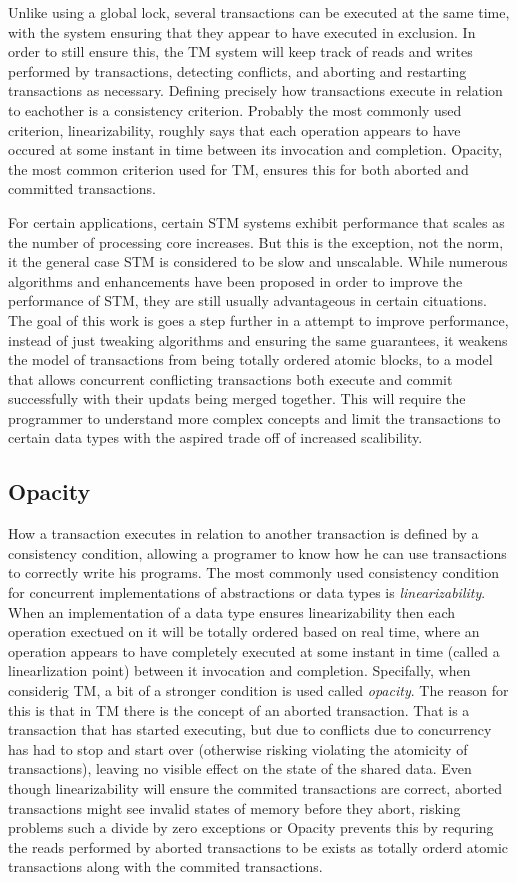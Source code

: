 \documentclass[11pt,letterpaper]{article}
\begin{document}
Unlike using a global lock, several transactions can be executed at the same time,
with the system ensuring that they appear to have executed in exclusion.
In order to still ensure this, the TM system will keep track of reads and writes
performed by transactions, detecting conflicts, and aborting and restarting transactions
as necessary.
Defining precisely how transactions execute in relation to eachother is a consistency criterion.
Probably the most commonly used criterion, linearizability, roughly says that each
operation appears to have occured at some instant in time between its invocation and completion.
Opacity, the most common criterion used for TM, ensures this for both aborted and committed transactions.

For certain applications, certain STM systems exhibit performance that scales as the number
of processing core increases.
But this is the exception, not the norm, it the general case STM is considered to be slow
and unscalable.
While numerous algorithms and enhancements have been proposed in order to improve the performance
of STM, they are still usually advantageous in certain cituations.
The goal of this work is goes a step further in a attempt to improve performance, instead of 
just tweaking algorithms and ensuring the same guarantees, it weakens the model of transactions
from being totally ordered atomic blocks, to a model that allows concurrent conflicting transactions
both execute and commit successfully with their updats being merged together.
This will require the programmer to understand more complex concepts and limit the transactions
to certain data types with the aspired trade off of increased scalibility.

\subsection{Opacity}
How a transaction executes in relation to another transaction is defined by a consistency condition,
allowing a programer to know how he can use transactions to correctly write his programs.
The most commonly used consistency condition for concurrent implementations of abstractions or data types
is \emph{linearizability}.
When an implementation of a data type ensures linearizability then each operation exectued on it will
be totally ordered based on real time, where an operation appears to have completely executed at
some instant in time (called a linearlization point) between it invocation and completion.
Specifally, when considerig TM, a bit of a stronger condition is used called \emph{opacity}.
The reason for this is that in TM there is the concept of an aborted transaction.
That is a transaction that has started executing, but due to conflicts due to concurrency
has had to stop and start over (otherwise risking violating the atomicity of transactions),
leaving no visible effect on the state of the shared data.
Even though linearizability will ensure the commited transactions are correct, aborted transactions
might see invalid states of memory before they abort, risking problems such a divide by zero exceptions
or 
Opacity prevents this by requring the reads performed by aborted transactions to be exists
as totally orderd atomic transactions along with the commited transactions.
\end{document}

